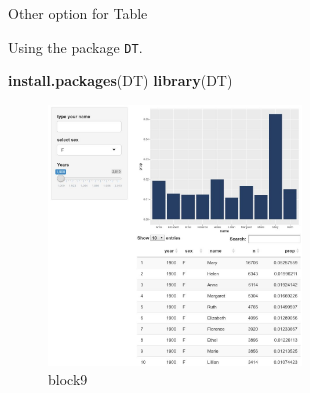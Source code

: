 \documentclass[
  ignorenonframetext,
]{beamer}
\newenvironment{Shaded}{\begin{snugshade}}{\end{snugshade}}
\newcommand{\KeywordTok}[1]{\textcolor[rgb]{0.13,0.29,0.53}{\textbf{#1}}}
\newcommand{\NormalTok}[1]{#1}
\newcommand{\StringTok}[1]{\textcolor[rgb]{0.31,0.60,0.02}{#1}}
\begin{document}
\begin{frame}[fragile]{Other option for Table}
\protect\hypertarget{other-option-for-table}{}

Using the package \texttt{DT}.

\begin{Shaded}
\begin{Highlighting}[]
  \KeywordTok{install.packages}\NormalTok{(}\StringTok{\textquotesingle{}DT\textquotesingle{}}\NormalTok{)}
  \KeywordTok{library}\NormalTok{(}\StringTok{\textquotesingle{}DT\textquotesingle{}}\NormalTok{)}
\end{Highlighting}
\end{Shaded}

\begin{figure}
\centering
\includegraphics[width=0.6\textwidth,height=\textheight]{images/dttable.jpg}
\caption{block9}
\end{figure}

\end{frame}
\end{document}
